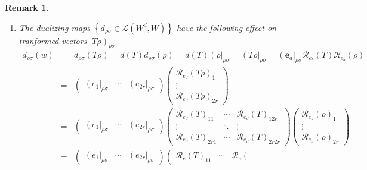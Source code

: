 \documentclass[aps,preprint]{revtex4}
\newtheorem{remark}[theorem]{Remark}
\begin{document}
\begin{remark}
\begin{enumerate}
\item The dualizing maps $\left\{ d_{\rho \sigma }\in \mathcal{L}\left(
W^{d},W\right) \right\} $ have the following effect on tranformed vectors $%
\left\vert T\rho \right) _{\rho \sigma }$ 
\begin{eqnarray}
d_{\rho \sigma }\left( w\right) &=&d_{\rho \sigma }\left( T\rho \right)
=d\left( T\right) d_{\rho \sigma }\left( \rho \right) =d\left( T\right)
\left( \rho \right\vert _{\rho \sigma }=\left( T\rho \right\vert _{\rho
\sigma }=\left( \boldsymbol{e}_{d}\right\vert _{\rho \sigma }\mathcal{R}%
_{e_{b}}\left( T\right) \mathcal{R}_{e_{b}}\left( \rho \right) \\
&=&\left( 
\begin{array}{ccc}
\left( e_{1}\right\vert _{\rho \sigma } & \cdots & \left( e_{2r}\right\vert
_{\rho \sigma }%
\end{array}%
\right) \left( 
\begin{array}{c}
\mathcal{R}_{e_{d}}\left( T\rho \right) _{1} \\ 
\vdots \\ 
\mathcal{R}_{e_{d}}\left( T\rho \right) _{2r}%
\end{array}%
\right) \\
&=&\left( 
\begin{array}{ccc}
\left( e_{1}\right\vert _{\rho \sigma } & \cdots & \left( e_{2r}\right\vert
_{\rho \sigma }%
\end{array}%
\right) \left( 
\begin{array}{ccc}
\mathcal{R}_{e_{d}}\left( T\right) _{11} & \cdots & \mathcal{R}%
_{e_{d}}\left( T\right) _{12r} \\ 
\vdots & \ddots & \vdots \\ 
\mathcal{R}_{e_{d}}\left( T\right) _{2r1} & \cdots & \mathcal{R}%
_{e_{d}}\left( T\right) _{2r2r}%
\end{array}%
\right) \left( 
\begin{array}{c}
\mathcal{R}_{e_{d}}\left( \rho \right) _{1} \\ 
\vdots \\ 
\mathcal{R}_{e_{d}}\left( \rho \right) _{2r}%
\end{array}%
\right) \\
&=&\left( 
\begin{array}{ccc}
\left( e_{1}\right\vert _{\rho \sigma } & \cdots & \left( e_{2r}\right\vert
_{\rho \sigma }%
\end{array}%
\right) \left( 
\begin{array}{ccc}
\mathcal{R}_{e}\left( T\right) _{11} & \cdots & \mathcal{R}_{e}\left(

\end{array}
\end{eqnarray}
\end{enumerate}
\end{remark}
\end{document}
